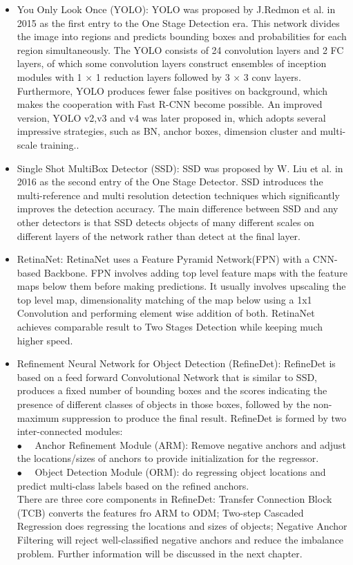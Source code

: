 \begin{itemize}
    \item You Only Look Once (YOLO):
    YOLO \cite{37} was proposed by J.Redmon et al. in 2015 as the first entry to the One Stage Detection era. This network divides the image into regions and predicts bounding boxes and probabilities for each region simultaneously. The YOLO consists of 24 convolution layers and 2 FC layers, of which some convolution layers construct ensembles of inception modules with 1 × 1 reduction layers followed by 3 × 3 conv layers. Furthermore, YOLO produces fewer false positives on background, which makes the cooperation with Fast R-CNN become possible. An improved version, YOLO v2,v3 and v4 was later proposed in, which adopts several impressive strategies, such as BN, anchor boxes, dimension cluster and multi-scale training.\cite{38,39,40}.

    \item Single Shot MultiBox Detector (SSD):
    SSD \cite{41} was proposed by W. Liu et al. in 2016 as the second entry of the One Stage Detector. SSD introduces the multi-reference and multi resolution detection techniques which significantly improves the detection accuracy. The main difference between SSD and any other detectors is that SSD detects objects of many different scales on different layers of the network rather than detect at the final layer.
    
    \item RetinaNet:
    RetinaNet \cite{42} uses a Feature Pyramid Network(FPN) with a CNN-based Backbone. FPN involves adding top level feature maps with the feature maps below them before making predictions. It usually involves upscaling the top level map, dimensionality matching of the map below using a 1x1 Convolution and performing element wise addition of both. RetinaNet achieves comparable result to Two Stages Detection while keeping much higher speed. 
    
    \item Refinement Neural Network for Object Detection (RefineDet):
     RefineDet \cite{43} is based on a feed forward Convolutional Network that is similar to SSD, produces a fixed number of bounding boxes and the scores indicating the presence of different classes of objects in those boxes, followed by the non-maximum suppression to produce the final result. RefineDet is formed by two inter-connected modules:\\
     $\bullet \quad$ Anchor Refinement Module (ARM): Remove negative anchors and adjust the locations/sizes of anchors to provide initialization for the regressor.\\
     $\bullet \quad$ Object Detection Module (ORM): do regressing object locations and predict multi-class labels based on the refined anchors.\\
     There are three core components in RefineDet: Transfer Connection Block (TCB) converts the features fro ARM to ODM; Two-step Cascaded Regression does regressing the locations and sizes of objects; Negative Anchor Filtering will reject well-classified negative anchors and reduce the imbalance problem. Further information will be discussed in the next chapter.
\end{itemize}

